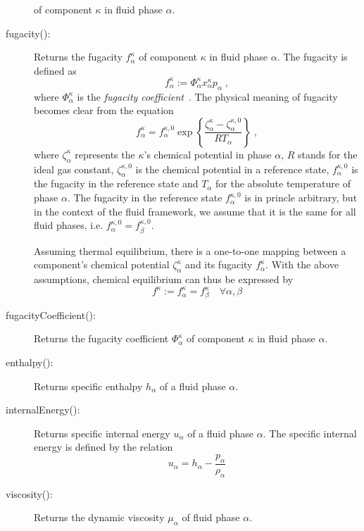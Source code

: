 \begin{description}
  of component $\kappa$ in fluid phase $\alpha$.
\item[fugacity():] Returns the fugacity $f^\kappa_\alpha$ of component
  $\kappa$ in fluid phase $\alpha$. The fugacity is defined as
  \[
  f_\alpha^\kappa := \Phi^\kappa_\alpha x^\kappa_\alpha p_\alpha \;,
  \]
  where $\Phi^\kappa_\alpha$ is the {\em fugacity
    coefficient}~\cite{reid1987}.  The physical meaning of fugacity
  becomes clear from the equation
  \[
  f_\alpha^\kappa = f_\alpha^{\kappa,0} \exp\left\{\frac{\zeta^\kappa_\alpha - \zeta^{\kappa,0}_\alpha}{R T_\alpha} \right\} \;,
  \]
  where $\zeta^\kappa_\alpha$ represents the $\kappa$'s chemical
  potential in phase $\alpha$, $R$ stands for the ideal gas constant,
  $\zeta^{\kappa,0}_\alpha$ is the chemical potential in a reference
  state, $f_\alpha^{\kappa,0}$ is the fugacity in the reference state
  and $T_\alpha$ for the absolute temperature of phase $\alpha$. The
  fugacity in the reference state $f_\alpha^{\kappa,0}$ is in princle
  arbitrary, but in the context of the \eWoms fluid framework, we
  assume that it is the same for all fluid phases, i.e.
  $f_\alpha^{\kappa,0} = f_\beta^{\kappa,0}$.
  
  Assuming thermal equilibrium, there is a one-to-one mapping between
  a component's chemical potential $\zeta^\kappa_\alpha$ and its
  fugacity $f^\kappa_\alpha$. With the above assumptions, chemical
  equilibrium can thus be expressed by
  \[
  f^\kappa := f^\kappa_\alpha = f^\kappa_\beta\quad\forall \alpha, \beta
  \]
\item[fugacityCoefficient():] Returns the fugacity coefficient
  $\Phi^\kappa_\alpha$ of component $\kappa$ in fluid phase $\alpha$.
\item[enthalpy():] Returns specific enthalpy $h_\alpha$ of a fluid
  phase $\alpha$.
\item[internalEnergy():] Returns specific internal energy $u_\alpha$
  of a fluid phase $\alpha$. The specific internal energy is defined
  by the relation
  \[
  u_\alpha = h_\alpha - \frac{p_\alpha}{\rho_\alpha}
  \]
\item[viscosity():] Returns the dynamic viscosity
  $\mu_\alpha$ of fluid phase $\alpha$.
\end{description}
  
